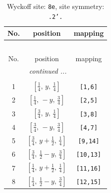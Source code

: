 \documentclass[fleqn,8pt]{jsarticle}
\begin{document}
\begin{longtable}{ccc}
\caption{Wyckoff site: {\tt 8e}, site symmetry: {\tt .2'.}}
 \\
 \hline \hline
No. & position & mapping \\ \hline \endfirsthead

\multicolumn{2}{l}{\tablename\ \thetable{}} \\
 \hline \hline
No. & position & mapping \\ \hline \endhead

 \hline \hline
\multicolumn{2}{r}{\footnotesize\it continued ...} \\ \endfoot

 \hline \hline
\multicolumn{2}{r}{} \\ \endlastfoot

1 & $\left[ \frac{1}{4},\, y,\, \frac{1}{4} \right]$ & {\tt [1,6]} \\ \hline
2 & $\left[ \frac{1}{4},\, - y,\, \frac{3}{4} \right]$ & {\tt [2,5]} \\ \hline
3 & $\left[ \frac{3}{4},\, y,\, \frac{1}{4} \right]$ & {\tt [3,8]} \\ \hline
4 & $\left[ \frac{3}{4},\, - y,\, \frac{3}{4} \right]$ & {\tt [4,7]} \\ \hline
5 & $\left[ \frac{3}{4},\, y + \frac{1}{2},\, \frac{1}{4} \right]$ & {\tt [9,14]} \\ \hline
6 & $\left[ \frac{3}{4},\, \frac{1}{2} - y,\, \frac{3}{4} \right]$ & {\tt [10,13]} \\ \hline
7 & $\left[ \frac{1}{4},\, y + \frac{1}{2},\, \frac{1}{4} \right]$ & {\tt [11,16]} \\ \hline
8 & $\left[ \frac{1}{4},\, \frac{1}{2} - y,\, \frac{3}{4} \right]$ & {\tt [12,15]} \\
\end{longtable}
\renewcommand{\arraystretch}{1.2}
\end{document}
